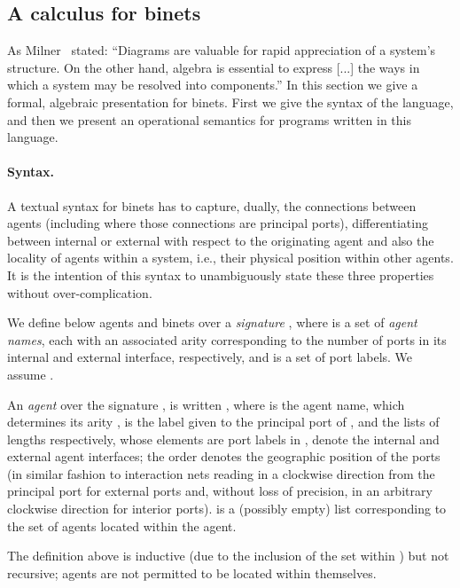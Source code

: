 \documentclass[copyright,creativecommons]{eptcs}
\begin{document}
\subsection{A calculus for binets}
\label{sec:formal}

As Milner~\cite{Milner} stated: ``Diagrams are valuable for rapid
appreciation of a system's structure. On the other hand, algebra is
essential to express [...] the ways in which a system may be resolved
into components.'' In this section we give a formal, algebraic
presentation for binets.  First we give the syntax of the language,
and then we present an operational semantics for programs written in
this language.

\paragraph{Syntax.}
\newcommand\bnet[5]{\ensuremath{#1^{#2} \langle #3 \,|\, #4 \,|\, #5 \rangle}}
\newcommand\bnets[2]{\ensuremath{#1^{#2} \langle \rangle}}
\newcommand\bnetm[3]{\ensuremath{#1^{#2} \langle #3 \rangle}}

A textual syntax for binets has to capture, dually, the connections
between agents (including where those connections are principal
ports), differentiating between internal or external with respect to
the originating agent and also the locality of agents within a system,
i.e., their physical position within other agents. It is the intention
of this syntax to unambiguously state these three properties without
over-complication. 

We define below agents and binets over a \emph{signature}
, where  is a set of \emph{agent names},
each with an associated arity  corresponding to the number of
ports in its internal and external interface, respectively, and  is
a set of port labels. We assume .


\begin{definition}[Agent]
An \emph{agent} over the signature ,  is written
, where  is the agent name,
which determines its arity ,  is the label given to
the principal port of , and the lists  of lengths 
respectively, whose elements are port labels in , denote the
internal and external agent interfaces; the order denotes the
geographic position of the ports (in similar fashion to interaction
nets reading in a clockwise direction from the principal port for
external ports and, without loss of precision, in an arbitrary
clockwise direction for interior ports).  is a (possibly empty)
list corresponding to the set of agents located within the agent.
\end{definition}
The definition above is inductive (due to the inclusion of the set 
within ) but not recursive; agents are not permitted to be located within themselves.
\end{document}
